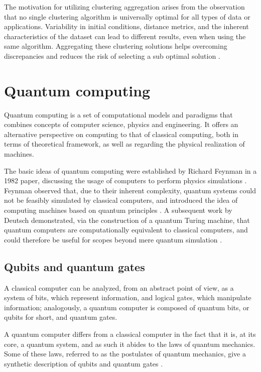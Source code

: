 The motivation for utilizing clustering aggregation arises from the observation that no single clustering algorithm is universally optimal for all types of data or applications. Variability in initial conditions, distance metrics, and the inherent characteristics of the dataset can lead to different results, even when using the same algorithm. Aggregating these clustering solutions helps overcoming discrepancies and reduces the risk of selecting a sub optimal solution \cite{strehl2002cluster}.


\section{Quantum computing}
Quantum computing is a set of computational models and paradigms that combines concepts of computer science, physics and engineering. It offers an alternative perspective on computing to that of classical computing, both in terms of theoretical framework, as well as regarding the physical realization of machines.

The basic ideas of quantum computing were established by Richard Feynman in a 1982 paper, discussing the usage of computers to perform physics simulations \cite{Feynman1982}. Feynman observed that, due to their inherent complexity, quantum systems could not be feasibly simulated by classical computers, and introduced the idea of computing machines based on quantum principles \cite{Feynman2017}. A subsequent work by Deutsch demonstrated, via the construction of a quantum Turing machine, that quantum computers are computationally equivalent to classical computers, and could therefore be useful for scopes beyond mere quantum simulation \cite{deutsch1985quantum}.

\subsection{Qubits and quantum gates}
\label{subsec:qubits}
A classical computer can be analyzed, from an abstract point of view, as a system of bits, which represent information, and logical gates, which manipulate information; analogously, a quantum computer is composed of quantum bits, or qubits for short, and quantum gates. 

A quantum computer differs from a classical computer in the fact that it is, at its core, a quantum system, and as such it abides to the laws of quantum mechanics. Some of these laws, referred to as the postulates of quantum mechanics, give a synthetic description of qubits and quantum gates \cite{Kaye2006}.

